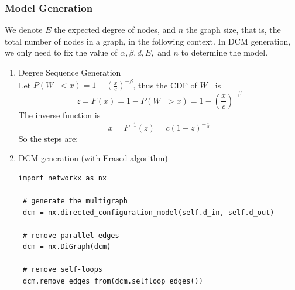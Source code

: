 \documentclass{article}
\begin{document}
\subsubsection{Model Generation}
\par We denote $E$ the expected degree of nodes, and $n$ the graph size, that is, the total number of nodes in a graph, in the following context. In DCM generation, we only need to fix the value of $\alpha, \beta, d, E,$ and $n$ to determine the model.

\begin{enumerate}
\item Degree Sequence Generation \\
Let  $P(W^- < x) = 1-(\frac{x}{c})^{- \beta}$, thus the CDF of  $W^-$ is
$$z=F(x) =1-P(W^->x)=1-(\frac{x}{c})^{-\beta}$$
The inverse function is
$$ x=F^{-1}(z)=c(1-z)^{-\frac{1}{\beta}}$$
So the steps are:

\item DCM generation (with Erased algorithm)
\begin{lstlisting}
import networkx as nx
 
 # generate the multigraph
 dcm = nx.directed_configuration_model(self.d_in, self.d_out)

 # remove parallel edges
 dcm = nx.DiGraph(dcm)
            
 # remove self-loops
 dcm.remove_edges_from(dcm.selfloop_edges())
\end{lstlisting}

\end{enumerate} 
\end{document}

